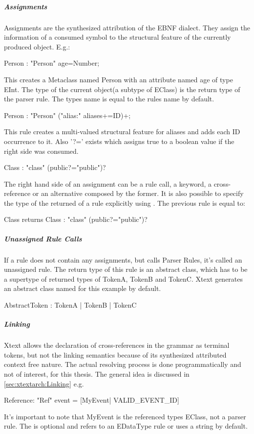 \subparagraph{Assignments}
Assignments are the synthesized attribution of the EBNF dialect. They assign the information of a consumed symbol to the structural feature of the currently produced object. E.g.:
\begin{xtxt}
Person : "Person" age=Number;
\end{xtxt}
This creates a Metaclass named Person with an attribute named age of type EInt. 
The type of the current object(a subtype of EClass) is the return type of the parser rule. The types name is equal to the rules name by default.
\begin{xtxt}
Person : "Person" ("alias:" aliases+=ID)+;
\end{xtxt}
This rule creates a multi-valued structural feature for aliases and adds each ID occurrence to it. Also '?=' exists which assigns true to a boolean value if the right side was consumed.
\begin{xtxt}
Class : "class" (public?="public")?
\end{xtxt}
The right hand side of an assignment can be a rule call, a keyword, a cross-reference or an alternative composed by the former. It is also possible to specify the type of the returned  of a rule explicitly using . The previous rule is equal to:
\begin{xtxt}
Class returns Class : "class" (public?="public")?
\end{xtxt}

\subparagraph{Unassigned Rule Calls}
If a rule does not contain any assignments, but calls Parser Rules, it's called an unassigned rule. The return type of this rule is an abstract class, which has to be a supertype of returned types of TokenA, TokenB and TokenC. Xtext generates an abstract class named  for this example by default.
\begin{xtxt}
AbstractToken :	TokenA |	TokenB |	TokenC
\end{xtxt}


\subparagraph{Linking}
Xtext allows the declaration of cross-references in the grammar as terminal tokens, but not the linking semantics because of its synthesized attributed context free nature. The actual resolving process is done programmatically and not of interest, for this thesis. The general idea is discussed in \ref{sec:xtextarch:Linking} 
e.g. 
\begin{xtxt}
Reference:  "Ref" event = [MyEvent| VALID_EVENT_ID]
\end{xtxt}
It's important to note that MyEvent is the referenced types EClass, not a parser rule. The   is optional and refers to an EDataType rule or uses a string by default.

